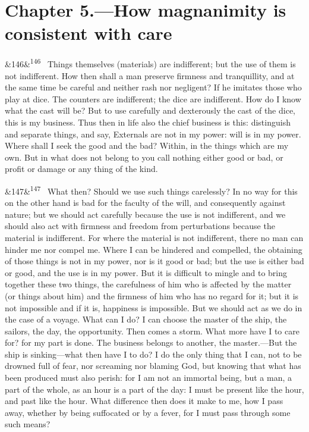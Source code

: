 \documentclass[12pt]{article}
\newcommand{\para}[1][]{\par\noindent\ifx&#1&\else\textsuperscript{\footnotesize #1}~\fi}
\begin{document}
\section*{Chapter 5.---How magnanimity is consistent with care}

\para[146] Things themselves (materials) are indifferent; but the use of them is not indifferent. How then shall a man preserve firmness and tranquillity, and at the same time be careful and neither rash nor negligent? If he imitates those who play at dice. The counters are indifferent; the dice are indifferent. How do I know what the cast will be? But to use carefully and dexterously the cast of the dice, this is my business. Thus then in life also the chief business is this: distinguish and separate things, and say, Externals are not in my power: will is in my power. Where shall I seek the good and the bad? Within, in the things which are my own. But in what does not belong to you call nothing either good or bad, or profit or damage or any thing of the kind.

\para[147] What then? Should we use such things carelessly? In no way for this on the other hand is bad for the faculty of the will, and consequently against nature; but we should act carefully because the use is not indifferent, and we should also act with firmness and freedom from perturbations because the material is indifferent. For where the material is not indifferent, there no man can hinder me nor compel me. Where I can be hindered and compelled, the obtaining of those things is not in my power, nor is it good or bad; but the use is either bad or good, and the use is in my power. But it is difficult to mingle and to bring together these two things, the carefulness of him who is affected by the matter (or things about him) and the firmness of him who has no regard for it; but it is not impossible and if it is, happiness is impossible. But we should act as we do in the case of a voyage. What can I do? I can choose the master of the ship, the sailors, the day, the opportunity. Then comes a storm. What more have I to care for? for my part is done. The business belongs to another, the master.—But the ship is sinking—what then have I to do? I do the only thing that I can, not to be drowned full of fear, nor screaming nor blaming God, but knowing that what has been produced must also perish: for I am not an immortal being, but a man, a part of the whole, as an hour is a part of the day: I must be present like the hour, and past like the hour. What difference then does it make to me, how I pass away, whether by being suffocated or by a fever, for I must pass through some such means?
\end{document}
